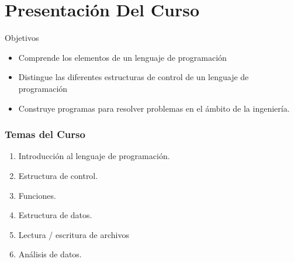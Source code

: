 \section{Presentación Del Curso}
\begin{frame}{Objetivos}

  \begin{itemize} \justifying \parskip3mm

\item	Comprende los elementos de un lenguaje de programación
\item	Distingue las diferentes estructuras de control de un lenguaje de programación
\item	Construye programas para resolver problemas en el ámbito de la ingeniería.  

  \end{itemize}

  
  
\end{frame}

\begin{frame}
  \frametitle{Temas del Curso}
  \begin{enumerate} \justifying \parskip3mm
  \item<only@1> Introducción al lenguaje de programación.
\item<only@1> Estructura de control.
\item<only@1> Funciones.
\item<only@1> Estructura de datos.
  \item<only@1> Lectura / escritura de archivos
\item<only@1> Análisis de datos.

  \end{enumerate}

\end{frame}




